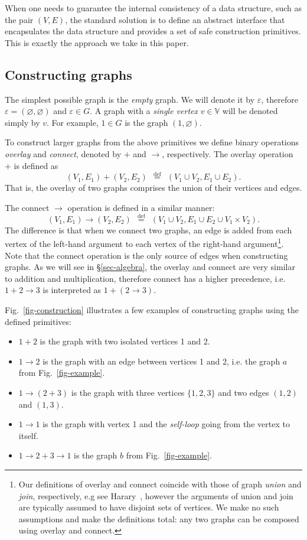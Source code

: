 \documentclass[acmlarge,anonymous]{acmart}\settopmatter{printfolios=true}
\newcommand{\defeq}{\stackrel{\text{def}}{=}}
\begin{document}
When one needs to guarantee the internal consistency of a data structure, such
as the pair $(V, E)$, the standard solution is to define an abstract interface
that encapsulates the data structure and provides a set of safe construction
primitives. This is exactly the approach we take in this paper.

\subsection{Constructing graphs}\label{sub-constructing}

The simplest possible graph is the \emph{empty} graph. We will denote it by
$\varepsilon$, therefore $\varepsilon = (\varnothing, \varnothing)$ and
$\varepsilon \in G$. A graph with a \emph{single vertex} $v \in \mathbb{V}$
will be denoted simply by $v$. For example, $1 \in G$ is the graph
$({1}, \varnothing)$.

To construct larger graphs from the above primitives we define binary
operations \emph{overlay} and \emph{connect}, denoted by $+$ and $\rightarrow$,
respectively. The overlay operation $+$ is defined as
\[
(V_1, E_1) + (V_2, E_2)~~\defeq~~(V_1 \cup V_2, E_1 \cup E_2).
\]
That is, the overlay of two graphs comprises the union of their vertices and edges.

The connect $\rightarrow$ operation is defined in a similar manner:
\[
(V_1, E_1) \rightarrow (V_2, E_2)~~\defeq~~(V_1 \cup V_2, E_1 \cup E_2 \cup V_1 \times V_2).
\]
The difference is that when we connect two graphs, an edge is added from each
vertex of the left-hand argument to each vertex of the right-hand
argument\footnote{Our definitions of overlay and connect coincide
with those of graph \emph{union} and \emph{join}, respectively,
e.g see Harary~\citeyear{1969_graph_theory_harary},
however the arguments of union and join are typically assumed to have disjoint
sets of vertices. We make no such assumptions and make the definitions total:
any two graphs can be composed using overlay and connect.
}.
Note that the connect operation is the only source of edges when constructing
graphs. As we will see in \S\ref{sec-algebra}, the overlay and connect are very
similar to addition and multiplication, therefore connect has a higher
precedence, i.e. $1 + 2 \rightarrow 3$ is interpreted as $1 + (2 \rightarrow 3)$.

\noindent
Fig.~\ref{fig-construction} illustrates a few examples of constructing graphs
using the defined primitives:
\begin{itemize}
  \item $1 + 2$ is the graph with two isolated vertices 1 and 2.
  \item $1 \rightarrow 2$ is the graph with an edge between vertices 1
  and 2, i.e. the graph $a$ from Fig.~\ref{fig-example}.
  \item $1 \rightarrow (2 + 3)$ is the graph with three vertices $\{1, 2, 3\}$
  and two edges $(1, 2)$ and $(1, 3)$.
  \item $1 \rightarrow 1$ is the graph with vertex 1 and the \emph{self-loop}
  going from the vertex to itself.
  \item $1 \rightarrow 2 + 3 \rightarrow 1$ is the graph $b$ from
  Fig.~\ref{fig-example}.
\end{itemize}
\end{document}
